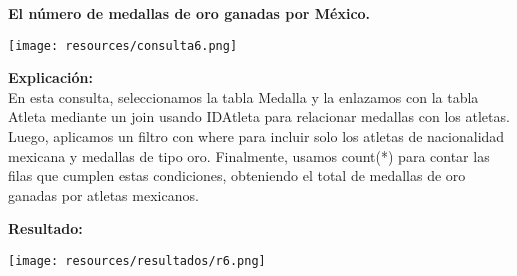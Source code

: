 \textbf{El número de medallas de oro ganadas por México.}\vspace{.3cm}

\begin{center}
	\texttt{[image: resources/consulta6.png]}
\end{center} 

\textbf{Explicación:} \\
En esta consulta, seleccionamos la tabla Medalla y la enlazamos con la tabla Atleta mediante un join usando IDAtleta para relacionar medallas con los atletas. Luego, aplicamos un filtro con where para incluir solo los atletas de nacionalidad mexicana y medallas de tipo oro. Finalmente, usamos count(*) para contar las filas que cumplen estas condiciones, obteniendo el total de medallas de oro ganadas por atletas mexicanos.
\vspace{.3cm}

\textbf{Resultado:}
\begin{center}
	\texttt{[image: resources/resultados/r6.png]}
\end{center} 
